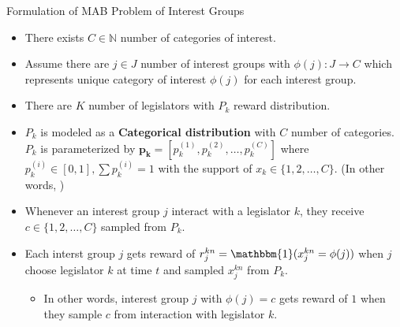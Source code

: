 \documentclass{beamer}
\begin{document}
	\begin{frame}{Formulation of MAB Problem of Interest Groups} 
		\begin{itemize}
			\item There exists $C \in \mathbb{N}$ number of categories of interest.
			\item Assume there are $j \in J$ number of interest groups with $\phi(j): J \rightarrow C$ which represents unique category of interest $\phi(j)$ for each interest group.
			\item There are $K$ number of legislators with $P_k$ reward distribution.
			\item $P_k$ is modeled as a \textbf{Categorical distribution} with $C$ number of categories. $P_k$ is parameterized by $\mathbf{p_k} = [p_k^{(1)}, p_k^{(2)}, \hdots, p_k^{(C)}]$ where $p_k^{(i)} \in [0,1], \sum{p_k^{(i)}}=1$ with the support of $x_k \in \{1,2,\hdots,C\}$.  
			(In other words, )
			\item Whenever an interest group $j$ interact with a legislator $k$, they receive $c \in \{1, 2, \hdots, C\}$ sampled from $P_k$.
			\item  Each interst group $j$ gets reward of $r_j^{kn} = \mathbbm{1}(x_j^{kn} = \phi(j))$ when $j$ choose legislator $k$ at time $t$ and sampled $x_j^{kn}$ from $P_k$. 
			\begin{itemize}
				\item In other words, interest group $j$ with $\phi(j) = c$ gets reward of $1$ when they sample $c$ from interaction with legislator $k$.
			\end{itemize}
		\end{itemize}
	\end{frame}
\end{document}
